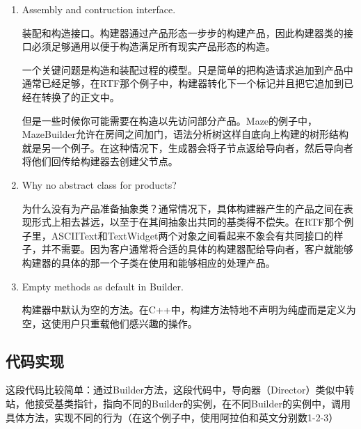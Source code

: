 \begin{enumerate}

\item Assembly and contruction interface.

	  装配和构造接口。构建器通过产品形态一步步的构建产品，因此构建器类的接口必须足够通用以便于构造满足所有现实产品形态的构造。

	  一个关键问题是构造和装配过程的模型。只是简单的把构造请求追加到产品中通常已经足够，在RTF那个例子中，构建器转化下一个标记并且把它追加到已经在转换了的正文中。

	  但是一些时候你可能需要在构造以先访问部分产品。Maze的例子中，MazeBuilder允许在房间之间加门，语法分析树这样自底向上构建的树形结构就是另一个例子。在这种情况下，生成器会将子节点返给导向者，然后导向者将他们回传给构建器去创建父节点。

\item Why no abstract class for products?

	  为什么没有为产品准备抽象类？通常情况下，具体构建器产生的产品之间在表现形式上相去甚远，以至于在其间抽象出共同的基类得不偿失。在RTF那个例子里，ASCIIText和TextWidget两个对象之间看起来不象会有共同接口的样子，并不需要。因为客户通常将合适的具体的构建器配给导向者，客户就能够构建器的具体的那一个子类在使用和能够相应的处理产品。

\item Empty methods as default in Builder.

      构建器中默认为空的方法。在C++中，构建方法特地不声明为纯虚而是定义为空，这使用户只重载他们感兴趣的操作。

\end{enumerate}

\subsection{代码实现}

这段代码比较简单：通过Builder方法，这段代码中，导向器（Director）类似中转站，他接受基类指针，指向不同的Builder的实例，在不同Builder的实例中，调用具体方法，实现不同的行为（在这个例子中，使用阿拉伯和英文分别数1-2-3）


